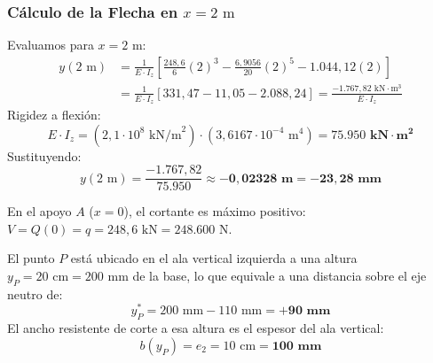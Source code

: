 \subsubsection*{Cálculo de la Flecha en $x = 2\text{ m}$}
Evaluamos para $x = 2\text{ m}$:
\begin{align}
    y(2\text{ m}) & = \frac{1}{E \cdot I_z} \left[ \frac{248{,}6}{6}(2)^3 - \frac{6{,}9056}{20}(2)^5 - 1.044{,}12(2) \right] \nonumber \\
                  & = \frac{1}{E \cdot I_z} \left[ 331{,}47 - 11{,}05 - 2.088{,}24 \right] = \frac{-1.767{,}82\text{ kN}\cdot\text{m}^3}{E \cdot I_z}
\end{align}
Rigidez a flexión:
\begin{equation}
    E \cdot I_z = (2{,}1 \cdot 10^8\text{ kN/m}^2) \cdot (3{,}6167 \cdot 10^{-4}\text{ m}^4) = \mathbf{75.950\text{ kN}\cdot\text{m}^2}
\end{equation}
Sustituyendo:
\begin{equation}
    \boxed{y(2\text{ m}) = \frac{-1.767{,}82}{75.950} \approx \mathbf{-0{,}02328\text{ m} = -23{,}28\text{ mm}}}
\end{equation}


En el apoyo $A$ ($x = 0$), el cortante es máximo positivo: $V = Q(0) = q = 248{,}6\text{ kN} = 248.600\text{ N}$.

El punto $P$ está ubicado en el ala vertical izquierda a una altura $y_P = 20\text{ cm} = 200\text{ mm}$ de la base, lo que equivale a una distancia sobre el eje neutro de:
\begin{equation}
    y_P^* = 200\text{ mm} - 110\text{ mm} = \mathbf{+90\text{ mm}}
\end{equation}
El ancho resistente de corte a esa altura es el espesor del ala vertical:
\begin{equation}
    b(y_P) = e_2 = 10\text{ cm} = \mathbf{100\text{ mm}}
\end{equation}

